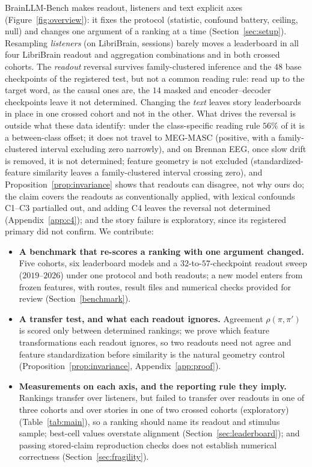 \documentclass{article}
\providecommand{\tightlist}{\setlength{\itemsep}{0pt}\setlength{\parskip}{0pt}}
\begin{document}
BrainLLM-Bench makes readout, listeners and text explicit axes (Figure~\ref{fig:overview}): it
fixes the protocol (statistic, confound battery, ceiling, null) and changes one argument of a
ranking at a time (Section~\ref{sec:setup}).
Resampling \emph{listeners} (on LibriBrain, sessions) barely moves a leaderboard in all four LibriBrain readout and aggregation
combinations and in both crossed cohorts. The \emph{readout} reversal survives family-clustered inference and the $48$
base checkpoints of the registered test, but not a common reading rule: read up to the target word,
as the causal ones are, the $14$ masked and encoder--decoder checkpoints leave it not determined. Changing the \emph{text} leaves story leaderboards in
place in one crossed cohort and not in the other. What drives the
reversal is outside what these data identify: under the class-specific reading rule $56\%$ of it is a between-class offset;
it does not travel to MEG-MASC (positive, with a family-clustered interval excluding zero narrowly), and on Brennan EEG, once slow drift is removed, it is not determined;
feature geometry is not excluded (standardized-feature similarity leaves a
family-clustered interval crossing zero), and Proposition~\ref{prop:invariance} shows that readouts can
disagree, not why ours do; the claim covers the readouts as conventionally applied, with lexical
confounds C1--C3 partialled out, and adding C4 leaves the reversal not determined (Appendix~\ref{app:c4}); and the story failure is exploratory, since its registered primary did
not confirm. We contribute:
\begin{itemize}
\tightlist
\item \textbf{A benchmark that re-scores a ranking with one argument changed.} Five cohorts, six
  leaderboard models and a $32$-to-$57$-checkpoint readout sweep ($2019$--$2026$) under one protocol and both readouts;
  a new model enters from frozen features, with routes, result files and numerical checks provided for review (Section~\ref{benchmark}).
\item \textbf{A transfer test, and what each readout ignores.} Agreement
  $\rho(\pi,\pi')$ is scored only between determined rankings; we prove which
  feature transformations each readout ignores, so two readouts need not agree and feature standardization before similarity is the natural geometry control (Proposition~\ref{prop:invariance},
  Appendix~\ref{app:proof}).
\item \textbf{Measurements on each axis, and the reporting rule they imply.} Rankings transfer over listeners, but failed to transfer over readouts in one
  of three cohorts and over stories in one of two crossed cohorts (exploratory) (Table~\ref{tab:main}), so a ranking should name its readout
  and stimulus sample; best-cell values
  overstate alignment (Section~\ref{sec:leaderboard}); and passing stored-claim reproduction checks does not establish numerical correctness
  (Section~\ref{sec:fragility}).
\end{itemize}
\end{document}
